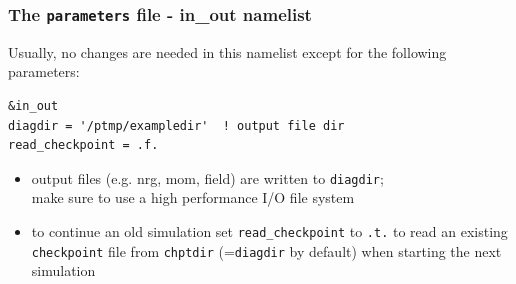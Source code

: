 \documentclass[9pt]{beamer}
\begin{document}
\begin{frame}[fragile]
  \frametitle{The {\tt parameters} file - in\_out namelist}

\begin{block}

Usually, no changes are needed in this namelist except for the following parameters:

\begin{block}

\begin{verbatim}
&in_out
diagdir = '/ptmp/exampledir'  ! output file dir
read_checkpoint = .f.
\end{verbatim}
\end{block}
\begin{itemize}
\item output files (e.g. nrg, mom, field) are written to {\tt diagdir};\\
make sure to use a high performance I/O file system
\item to continue an old simulation set {\tt read\_checkpoint} to {\tt .t.} to read an existing {\tt checkpoint} file from {\tt chptdir} (={\tt diagdir} by default) when starting the next simulation
\end{itemize}
\end{block}
\end{frame}


\end{document}
